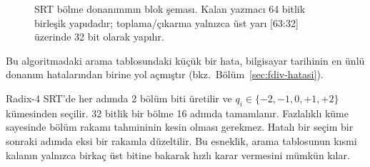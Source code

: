 \begin{figure}[htbp]
\caption[SRT b{\"o}lme donan{\i}m{\i}]{SRT bölme donanımının blok şeması. Kalan yazmacı 64 bitlik birleşik yapıdadır; toplama/çıkarma yalnızca üst yarı [63:32] üzerinde 32 bit olarak yapılır.}
\label{fig:srt-donanim}
\end{figure}

Bu algoritmadaki arama tablosundaki küçük bir hata, bilgisayar tarihinin en ünlü donanım hatalarından birine yol açmıştır (bkz.\ Bölüm~\ref{sec:fdiv-hatasi}).

Radix-4 SRT'de her adımda 2 bölüm biti üretilir ve $q_i \in \{-2, -1, 0, +1, +2\}$ kümesinden seçilir. 32 bitlik bir bölme 16 adımda tamamlanır. Fazlalıklı küme sayesinde bölüm rakamı tahmininin kesin olması gerekmez. Hatalı bir seçim bir sonraki adımda eksi bir rakamla düzeltilir. Bu esneklik, arama tablosunun kısmi kalanın yalnızca birkaç üst bitine bakarak hızlı karar vermesini mümkün kılar.

